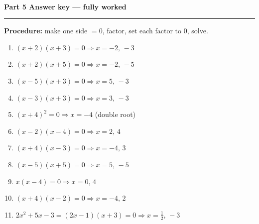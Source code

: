 \documentclass[11pt]{article}
\newcommand{\parthead}[1]{\vspace{6pt}{\color{bigC}\rule{\linewidth}{2pt}}\\[3pt]{\LARGE\bfseries\color{bigC!80!black} #1}\\[2pt]{\color{bigC}\rule{\linewidth}{2pt}}\vspace{6pt}}
\begin{document}
\parthead{Part 5 \; Answer key --- fully worked}
\textbf{Procedure:} make one side $=0$, factor, set each factor to $0$, solve.\\[6pt]
\begin{enumerate}[label=\textbf{\arabic*.},itemsep=3pt]
\item $(x+2)(x+3)=0\Rightarrow x=-2,\,-3$
\item $(x+2)(x+5)=0\Rightarrow x=-2,\,-5$
\item $(x-5)(x+3)=0\Rightarrow x=5,\,-3$
\item $(x-3)(x+3)=0\Rightarrow x=3,\,-3$
\item $(x+4)^{2}=0\Rightarrow x=-4$ (double root)
\item $(x-2)(x-4)=0\Rightarrow x=2,\,4$
\item $(x+4)(x-3)=0\Rightarrow x=-4,\,3$
\item $(x-5)(x+5)=0\Rightarrow x=5,\,-5$
\item $x(x-4)=0\Rightarrow x=0,\,4$
\item $(x+4)(x-2)=0\Rightarrow x=-4,\,2$
\item $2x^{2}+5x-3=(2x-1)(x+3)=0\Rightarrow x=\tfrac{1}{2},\,-3$
\end{enumerate}
\end{document}
